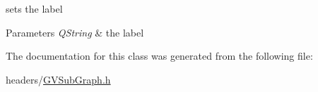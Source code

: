 sets the label 


\begin{DoxyParams}{\-Parameters}
{\em \-Q\-String} & the label \\
\hline
\end{DoxyParams}


\-The documentation for this class was generated from the following file\-:\begin{DoxyCompactItemize}
\item 
headers/\hyperlink{_g_v_sub_graph_8h}{\-G\-V\-Sub\-Graph.\-h}\end{DoxyCompactItemize}
